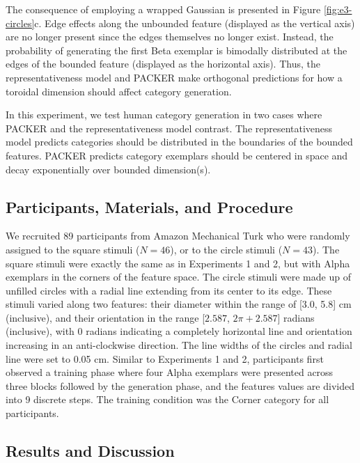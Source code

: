 \documentclass[pdflatex,sn-apa]{sn-jnl}%
\theoremstyle{thmstyleone}%
\theoremstyle{thmstyletwo}%
\theoremstyle{thmstylethree}%
\begin{document}
The consequence of employing a wrapped Gaussian is presented in Figure \ref{fig:e3-circles}c. Edge effects along the
unbounded feature (displayed as the vertical axis) are no longer present since the edges themselves no longer exist.
Instead, the probability of generating the first Beta exemplar is bimodally distributed at the edges of the bounded
feature (displayed as the horizontal axis). Thus, the representativeness model and PACKER make orthogonal predictions
for how a toroidal dimension should affect category generation. 

In this experiment, we test human category generation in two cases where PACKER and the representativeness model
contrast. The representativeness model predicts categories should be distributed in the boundaries of the bounded
features. PACKER predicts category exemplars should be centered in space and decay exponentially over bounded
dimension(s).

\subsection{Participants, Materials, and Procedure}

We recruited 89 participants from Amazon Mechanical Turk who were randomly
assigned to the square stimuli ($N=46$), or to the circle stimuli ($N=43$). The
square stimuli were exactly the same as in Experiments 1 and 2, but with Alpha
exemplars in the corners of the feature space. The circle stimuli were made up
of unfilled circles with a radial line extending from its center to its edge.
These stimuli varied along two features: their diameter within the range of
[3.0, 5.8] cm (inclusive), and their orientation in the range [$2.587$,
$2\pi + 2.587$] radians (inclusive), with $0$ radians indicating a completely
horizontal line and orientation increasing in an anti-clockwise direction. The
line widths of the circles and radial line were set to 0.05 cm. Similar to
Experiments 1 and 2, participants first observed a training phase where four
Alpha exemplars were presented across three blocks followed by the generation
phase, and the features values are divided into 9 discrete steps. The training
condition was the Corner category for all participants.

\subsection{Results and Discussion}
\end{document}
